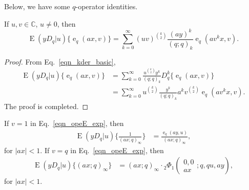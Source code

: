 \documentclass{cimart}
\newcommand{\C}{\mathbb{C}}
\DeclareMathOperator{\ope}{e}
\DeclareMathOperator{\opE}{E}
\begin{document}
Below, we have some $q$-operator identities.
\begin{theorem}\label{theo_opeE_exp}
If $u,v\in\C$, $u\neq0$, then
    \begin{equation}\label{eqn_opeE_exp}
        \opE(yD_{q}|u)\big\{\ope_{q}(ax,v)\big\}=\sum_{k=0}^{\infty}\left(uv\right)^{\binom{k}{2}}\frac{(ay)^k}{(q;q)_{k}}\ope_{q}\left(av^{k}x,v\right).
    \end{equation}
\end{theorem}
\begin{proof}
From Eq.~\eqref{eqn_kder_basic},
    \begin{align*}
        \opE(yD_{q}|u)\big\{\ope_{q}(ax,v)\big\}
        &=\sum_{k=0}^{\infty}\frac{u^{\binom{k}{2}}y^{k}}{(q;q)_{k}}D_{q}^k\{\ope_{q}(ax,v)\}\\
        &=\sum_{k=0}^{\infty}u^{\binom{k}{2}}\frac{y^k}{(q;q)_{k}}a^{k}v^{\binom{k}{2}}\ope_{q}\left(av^kx,v\right).
    \end{align*}
The proof is completed.
\end{proof}
If $v=1$ in Eq.~\eqref{eqn_opeE_exp}, then
\begin{align}\label{eqn_ope_EI}
    \opE(yD_{q}|u)\bigg\{\frac{1}{(ax;q)_{\infty}}\bigg\}&=\frac{\ope_{q}(ay,u)}{(ax;q)_{\infty}},
\end{align}
for $\vert ax\vert<1$. If $v=q$ in Eq.~\eqref{eqn_opeE_exp}, then
\begin{align}\label{eqn_ope_EII}
    \opE(yD_{q}|u)\{(ax;q)_{\infty}\}&=(ax;q)_{\infty}\cdot{}_{2}\Phi_{1}\left(
        \begin{array}{c}
             0,0 \\
             ax
        \end{array};
        q,qu, a y
        \right),
\end{align}
for $\vert ax\vert<1$.
\end{document}
